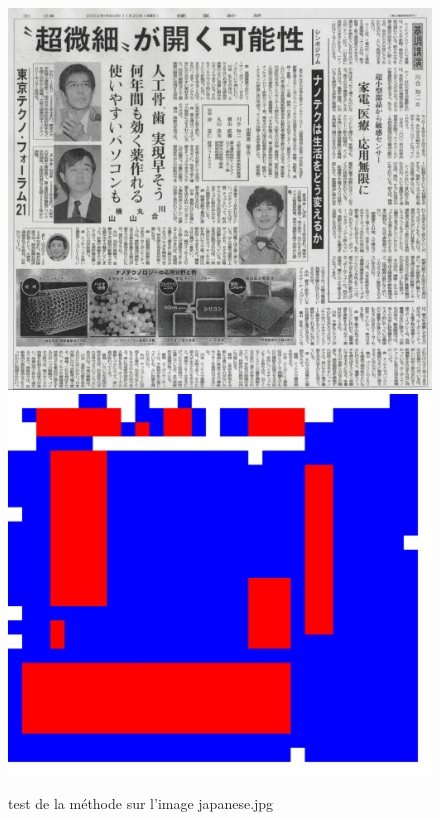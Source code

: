 \documentclass{book}
\begin{document}
\begin{figure}[H]
\begin{center}
\includegraphics[scale=0.2]{../test/japanese.jpg}
\includegraphics[scale=0.05]{../test/japanese_res_hog_hsv_kmeans.jpg}
\end{center}
\caption{test de la méthode sur l'image japanese.jpg}
\label{test3}
\end{figure}
\end{document}
